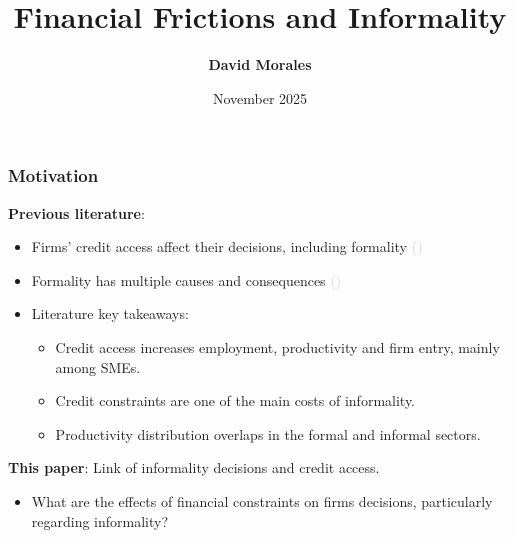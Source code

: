 \documentclass[aspectratio=169]{beamer} %
\title[Financial Frictions and Informality]{Financial Frictions and Informality} %
\author[David Morales]{\textbf{David Morales}}
\institute[TSE]{\textbf{Toulouse School of Economics}}
\date[November 2025] %
{November 2025}
\begin{document}
\begin{frame}[noframenumbering]
\titlepage %
\end{frame}





\begin{frame}
\frametitle{\textbf{Motivation}}
\textbf{Previous literature}:

\begin{itemize}
    \item Firms' credit access affect their decisions, including formality \textcolor{lightgray}{(\cite{amiti2018much,greenstone2020credit,gutierrez2023credit})}
    \vspace{5mm}
    \item Formality has multiple causes and consequences \textcolor{lightgray}{(\cite{ulyssea2018firms,meghir2015wages})}
    \vspace{5mm}
    \item Literature key takeaways:
    \begin{itemize}
        \item Credit access increases employment, productivity and firm entry, mainly among SMEs.
        \item Credit constraints are one of the main costs of informality. 
        \item Productivity distribution overlaps in the formal and informal sectors.
    \end{itemize}
\end{itemize}

\vspace{5mm}
\textbf{This paper}: Link of informality decisions and credit access.

\begin{itemize}
    \item What are the effects of financial constraints on firms decisions, particularly regarding informality?
\end{itemize}

\end{frame}

\end{document}

